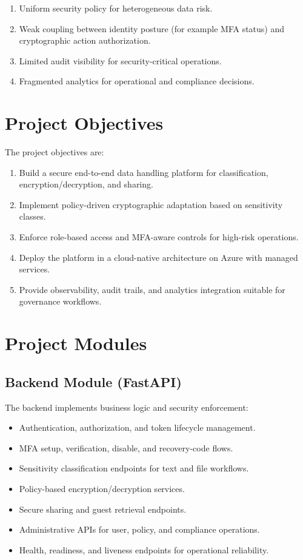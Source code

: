 \documentclass[12pt,a4paper]{article}
\begin{document}
\begin{enumerate}[leftmargin=1.4em]
  \item Uniform security policy for heterogeneous data risk.
  \item Weak coupling between identity posture (for example MFA status) and cryptographic action authorization.
  \item Limited audit visibility for security-critical operations.
  \item Fragmented analytics for operational and compliance decisions.
\end{enumerate}

\section{Project Objectives}

The project objectives are:

\begin{enumerate}[leftmargin=1.4em]
  \item Build a secure end-to-end data handling platform for classification, encryption/decryption, and sharing.
  \item Implement policy-driven cryptographic adaptation based on sensitivity classes.
  \item Enforce role-based access and MFA-aware controls for high-risk operations.
  \item Deploy the platform in a cloud-native architecture on Azure with managed services.
  \item Provide observability, audit trails, and analytics integration suitable for governance workflows.
\end{enumerate}

\section{Project Modules}

\subsection{Backend Module (FastAPI)}

The backend implements business logic and security enforcement:

\begin{itemize}[leftmargin=1.4em]
  \item Authentication, authorization, and token lifecycle management.
  \item MFA setup, verification, disable, and recovery-code flows.
  \item Sensitivity classification endpoints for text and file workflows.
  \item Policy-based encryption/decryption services.
  \item Secure sharing and guest retrieval endpoints.
  \item Administrative APIs for user, policy, and compliance operations.
  \item Health, readiness, and liveness endpoints for operational reliability.
\end{itemize}
\end{document}
